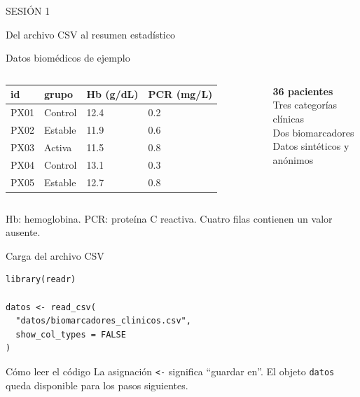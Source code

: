 \documentclass[aspectratio=169,11pt]{beamer}
\begin{document}
\begin{frame}[plain]
\centering
\vfill
{\color{verde}\fontsize{19}{22}\selectfont SESIÓN 1}\par
\vspace{0.25cm}
{\color{azul}\fontsize{30}{34}\selectfont Del archivo CSV al resumen estadístico}\par
\vfill
\end{frame}

\begin{frame}{Datos biomédicos de ejemplo}
\begin{columns}[T,onlytextwidth]
  {\small\begin{tabular}{llll}
  \toprule
  id & grupo & Hb (g/dL) & PCR (mg/L)\\
  \midrule
  PX01 & Control & 12.4 & 0.2\\
  PX02 & Estable & 11.9 & 0.6\\
  PX03 & Activa & 11.5 & 0.8\\
  PX04 & Control & 13.1 & 0.3\\
  PX05 & Estable & 12.7 & 0.8\\
  \bottomrule
  \end{tabular}}
  \textbf{36 pacientes}\\[0.2cm]
  Tres categorías clínicas\\[0.2cm]
  Dos biomarcadores\\[0.2cm]
  Datos sintéticos y anónimos
\end{columns}

\vspace{0.5cm}
\small Hb: hemoglobina. PCR: proteína C reactiva. Cuatro filas contienen un valor ausente.
\end{frame}

\begin{frame}[fragile]{Carga del archivo CSV}
\begin{lstlisting}
library(readr)

datos <- read_csv(
  "datos/biomarcadores_clinicos.csv",
  show_col_types = FALSE
)
\end{lstlisting}

\vspace{0.35cm}
\begin{block}{Cómo leer el código}
La asignación \texttt{<-} significa ``guardar en''. El objeto \texttt{datos} queda disponible para los pasos siguientes.
\end{block}
\end{frame}
\end{document}
